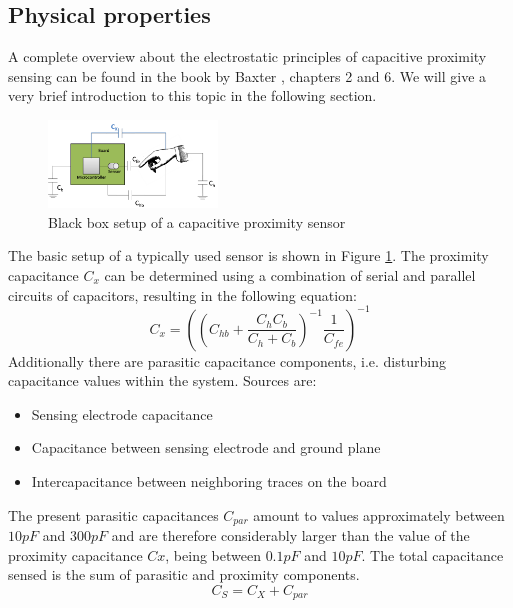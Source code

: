 \subsection{Physical properties}
A complete overview about the electrostatic principles of capacitive proximity sensing can be found in the book by Baxter \cite{Baxter1996}, chapters 2 and 6. We will give a very brief introduction to this topic in the following section.
\begin{figure}[h]
\centering
\includegraphics[width=0.4\textwidth]{images/cap_blackbox.png}
\caption{Black box setup of a capacitive proximity sensor}
\label{fig:cap_blackbox}
\end{figure}
The basic setup of a typically used sensor is shown in Figure \ref{fig:cap_blackbox}. The proximity capacitance \(C_{x}\) can be determined using a combination of serial and parallel circuits of capacitors, resulting in the following equation:
\begin{equation}
C_{x}=\left(\left(C_{hb}+\frac{C_{h}C_{b}}{C_{h}+C_{b}}\right)^{-1}\frac{1}{C_{fe}}\right)^{-1}
\end{equation}
Additionally there are parasitic capacitance components, i.e. disturbing capacitance values within the system. Sources are:
\begin{itemize}
\item Sensing electrode capacitance
\item Capacitance between sensing electrode and ground plane
\item Intercapacitance between neighboring traces on the board
\end{itemize}
The present parasitic capacitances \(C_{par}\) amount to values approximately between \(10pF\) and \(300pF\) and are therefore considerably larger than the value of the proximity capacitance \(Cx\), being between \(0.1pF\) and \(10pF\). The total capacitance sensed is the sum of parasitic and proximity components. 
\begin{equation}
C_{S}=C_{X}+C_{par}
\end{equation}

